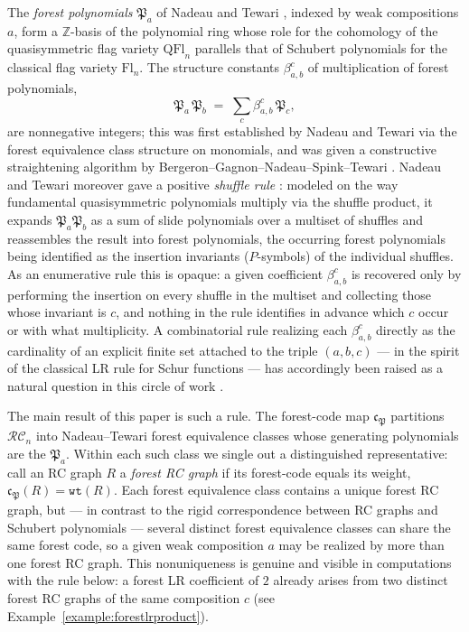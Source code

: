 \documentclass{amsart}
\theoremstyle{definition}
\theoremstyle{remark}
\numberwithin{equation}{subsection}
\newcommand{\wtt}{\mathtt{wt}}
\newcommand{\RC}{\mathcal{RC}}
\newcommand{\code}{\mathfrak{c}}
\newcommand{\forest}{\mathfrak{P}}
\begin{document}
The \emph{forest polynomials} $\forest_a$ of Nadeau and Tewari \cite{nadeau2024forest}, indexed by weak compositions $a$, form a $\mathbb{Z}$-basis of the polynomial ring whose role for the cohomology of the quasisymmetric flag variety $\mathrm{QFl}_n$ \cite{bergeron2025qsymflag} parallels that of Schubert polynomials for the classical flag variety $\mathrm{Fl}_n$. The structure constants $\beta_{a,b}^c$ of multiplication of forest polynomials,
$$\forest_a\,\forest_b \;=\; \sum_c \beta_{a,b}^c\,\forest_c,$$
are nonnegative integers; this was first established by Nadeau and Tewari \cite{nadeau2024forest} via the forest equivalence class structure on monomials, and was given a constructive straightening algorithm by Bergeron--Gagnon--Nadeau--Spink--Tewari \cite{bergeron2025equivariant}. Nadeau and Tewari moreover gave a positive \emph{shuffle rule} \cite[\S6]{nadeau2024forest}: modeled on the way fundamental quasisymmetric polynomials multiply via the shuffle product, it expands $\forest_a\forest_b$ as a sum of slide polynomials over a multiset of shuffles and reassembles the result into forest polynomials, the occurring forest polynomials being identified as the insertion invariants ($P$-symbols) of the individual shuffles. As an enumerative rule this is opaque: a given coefficient $\beta_{a,b}^c$ is recovered only by performing the insertion on every shuffle in the multiset and collecting those whose invariant is $c$, and nothing in the rule identifies in advance which $c$ occur or with what multiplicity. A combinatorial rule realizing each $\beta_{a,b}^c$ directly as the cardinality of an explicit finite set attached to the triple $(a,b,c)$ --- in the spirit of the classical LR rule for Schur functions --- has accordingly been raised as a natural question in this circle of work \cite{nadeau2024forest,nadeau2024quasisymmetric,bergeron2025qsymflag}.

The main result of this paper is such a rule. The forest-code map $\code_\forest$ partitions $\RC_n$ into Nadeau--Tewari forest equivalence classes whose generating polynomials are the $\forest_a$. Within each such class we single out a distinguished representative: call an RC graph $R$ a \emph{forest RC graph} if its forest-code equals its weight, $\code_\forest(R) = \wtt(R)$. Each forest equivalence class contains a unique forest RC graph, but --- in contrast to the rigid correspondence between RC graphs and Schubert polynomials --- several distinct forest equivalence classes can share the same forest code, so a given weak composition $a$ may be realized by more than one forest RC graph. This nonuniqueness is genuine and visible in computations with the rule below: a forest LR coefficient of $2$ already arises from two distinct forest RC graphs of the same composition $c$ (see Example~\ref{example:forestlrproduct}).
\end{document}
